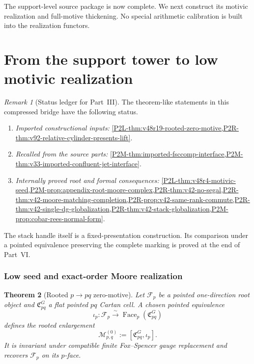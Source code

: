 \documentclass[11pt]{article}
\newtheorem{theorem}{Theorem}[section]
\theoremstyle{remark}
\newtheorem{remark}[theorem]{Remark}
\begin{document}
\medskip
The support-level source package is now complete.  We next construct its
motivic realization and full-motive thickening.  No special arithmetic
calibration is built into the realization functors.

\part{From the support tower to low motivic realization}

\begin{remark}[Status ledger for Part~III]
\label{P2R-rem:part-three-status-ledger}
The theorem-like statements in this compressed bridge have the following
status.
\begin{enumerate}[label=\textup{(\alph*)}]
\item \emph{Imported constructional inputs:}
      \cref{P2L-thm:v48r19-rooted-zero-motive,P2R-thm:v92-relative-cylinder-presents-lift}.
\item \emph{Recalled from the source parts:}
      \cref{P2M-thm:imported-fsccomp-interface,P2M-thm:v33-imported-confluent-jet-interface}.
\item \emph{Internally proved root and formal consequences:}
      \cref{P2L-thm:v48r4-motivic-seed,P2M-prop:appendix-root-moore-complex,P2R-thm:v42-no-segal,P2R-thm:v42-moore-matching-completion,P2R-prop:v42-same-rank-commute,P2R-thm:v42-single-dg-globalization,P2R-thm:v42-stack-globalization,P2M-prop:cobar-rees-normal-form}.
\end{enumerate}
The stack handle itself is a fixed-presentation construction.  Its comparison
under a pointed equivalence preserving the complete marking is proved at the
end of Part~VI.
\end{remark}

\section{Low seed and exact-order Moore realization}

\begin{theorem}[Rooted \(p\to pq\) zero-motive]
\label{P2L-thm:v48r19-rooted-zero-motive}
Let \(\mathcal F_p\) be a pointed one-direction root object and
\(\mathfrak C^G_{pq}\) a flat pointed \(pq\) Cartan cell.  A chosen pointed
equivalence
\[
 \iota_p:\mathcal F_p\xrightarrow{\sim}
 \operatorname{Face}_p(\mathfrak C^G_{pq})
\]
defines the rooted enlargement
\[
 \mathcal M^{(0)}_{p,q}:=[\mathfrak C^G_{pq},\iota_p].
\]
It is invariant under compatible finite Fox--Spencer gauge replacement and
recovers \(\mathcal F_p\) on its \(p\)-face.
\end{theorem}
\end{document}
